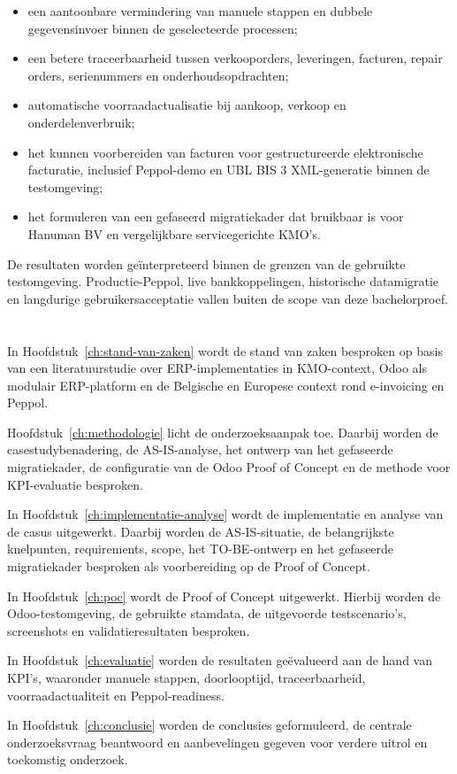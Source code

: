 \begin{itemize}
    \item een aantoonbare vermindering van manuele stappen en dubbele gegevensinvoer binnen de geselecteerde processen;
    \item een betere traceerbaarheid tussen verkooporders, leveringen, facturen, repair orders, serienummers en onderhoudsopdrachten;
    \item automatische voorraadactualisatie bij aankoop, verkoop en onderdelenverbruik;
    \item het kunnen voorbereiden van facturen voor gestructureerde elektronische facturatie, inclusief Peppol-demo en UBL BIS 3 XML-generatie binnen de testomgeving;
    \item het formuleren van een gefaseerd migratiekader dat bruikbaar is voor Hanuman BV en vergelijkbare servicegerichte KMO's.
\end{itemize}

De resultaten worden geïnterpreteerd binnen de grenzen van de gebruikte testomgeving. Productie-Peppol, live bankkoppelingen, historische datamigratie en langdurige gebruikersacceptatie vallen buiten de scope van deze bachelorproef.

\section{}%
\label{sec:opzet-bachelorproef}

In Hoofdstuk~\ref{ch:stand-van-zaken} wordt de stand van zaken besproken op basis van een literatuurstudie over ERP-implementaties in KMO-context, Odoo als modulair ERP-platform en de Belgische en Europese context rond e-invoicing en Peppol.

Hoofdstuk~\ref{ch:methodologie} licht de onderzoeksaanpak toe. Daarbij worden de casestudybenadering, de AS-IS-analyse, het ontwerp van het gefaseerde migratiekader, de configuratie van de Odoo Proof of Concept en de methode voor KPI-evaluatie besproken.

In Hoofdstuk~\ref{ch:implementatie-analyse} wordt de implementatie en analyse van de casus uitgewerkt. Daarbij worden de AS-IS-situatie, de belangrijkste knelpunten, requirements, scope, het TO-BE-ontwerp en het gefaseerde migratiekader besproken als voorbereiding op de Proof of Concept.

In Hoofdstuk~\ref{ch:poc} wordt de Proof of Concept uitgewerkt. Hierbij worden de Odoo-testomgeving, de gebruikte stamdata, de uitgevoerde testscenario's, screenshots en validatieresultaten besproken.

In Hoofdstuk~\ref{ch:evaluatie} worden de resultaten geëvalueerd aan de hand van KPI's, waaronder manuele stappen, doorlooptijd, traceerbaarheid, voorraadactualiteit en Peppol-readiness.

In Hoofdstuk~\ref{ch:conclusie} worden de conclusies geformuleerd, de centrale onderzoeksvraag beantwoord en aanbevelingen gegeven voor verdere uitrol en toekomstig onderzoek.